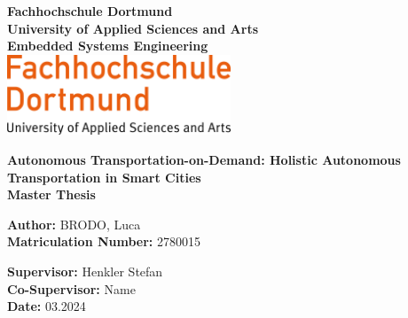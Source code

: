 

\begin{titlepage}
    \centering
    \vspace*{0.5cm}
    \Large
    \textbf{Fachhochschule Dortmund} \\
    \textbf{University of Applied Sciences and Arts} \\
    \textbf{Embedded Systems Engineering}\\
	\centering
	\vspace{1cm}
	\includegraphics[width=0.5\textwidth]{assets/img/01_title/FH_Dortmund-logo.svg.png}

    \vspace{2cm}

    \LARGE
    \textbf{Autonomous Transportation-on-Demand: Holistic Autonomous Transportation in Smart Cities} \\
     \vspace{1cm}
    \textbf{Master Thesis}

    \vspace{1cm}

    \large
    \textbf{Author:} \hspace{0.5cm} BRODO, Luca\\
    \textbf{Matriculation Number:} \hspace{0.5cm} 2780015

    \vspace{1cm}


    
   

    \textbf{Supervisor:} \hspace{0.5cm} Henkler Stefan \\
    \textbf{Co-Supervisor:} \hspace{0.5cm} Name \\
    \textbf{Date:} \hspace{0.5cm} 03.2024

    \vfill
    \vspace{1cm}

\end{titlepage}

